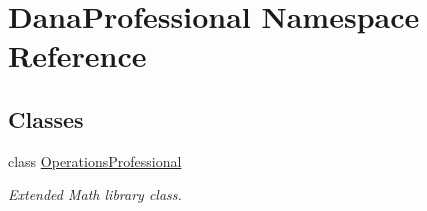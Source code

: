 \hypertarget{namespaceDanaProfessional}{}\section{Dana\+Professional Namespace Reference}
\label{namespaceDanaProfessional}
\subsection*{Classes}
\begin{DoxyCompactItemize}
\item 
class \hyperlink{classDanaProfessional_1_1OperationsProfessional}{Operations\+Professional}
\begin{DoxyCompactList}\small\item\em Extended Math library class. \end{DoxyCompactList}\end{DoxyCompactItemize}
